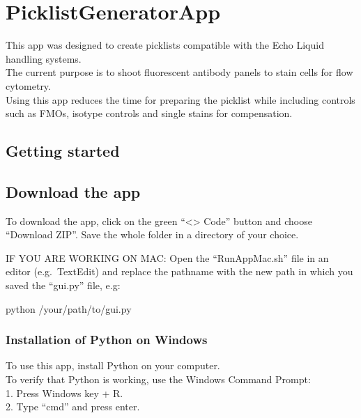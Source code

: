 \documentclass[
]{article}
\author{}
\date{\vspace{-2.5em}}
\newenvironment{Shaded}{\begin{snugshade}}{\end{snugshade}}
\newcommand{\NormalTok}[1]{#1}
\begin{document}
\hypertarget{picklistgeneratorapp}{%
\section{PicklistGeneratorApp}\label{picklistgeneratorapp}}

This app was designed to create picklists compatible with the Echo
Liquid handling systems.\\
The current purpose is to shoot fluorescent antibody panels to stain
cells for flow cytometry.\\
Using this app reduces the time for preparing the picklist while
including controls such as FMOs, isotype controls and single stains for
compensation.

\hypertarget{getting-started}{%
\subsection{Getting started}\label{getting-started}}

\hypertarget{download-the-app}{%
\subsection{Download the app}\label{download-the-app}}

To download the app, click on the green ``\textless\textgreater{} Code''
button and choose ``Download ZIP''. Save the whole folder in a directory
of your choice.

IF YOU ARE WORKING ON MAC: Open the ``RunAppMac.sh'' file in an editor
(e.g.~TextEdit) and replace the pathname with the new path in which you
saved the ``gui.py'' file, e.g:

\begin{Shaded}
\begin{Highlighting}[]
\NormalTok{python /your/path/to/gui.py}
\end{Highlighting}
\end{Shaded}

\hypertarget{installation-of-python-on-windows}{%
\subsubsection{Installation of Python on
Windows}\label{installation-of-python-on-windows}}

To use this app, install Python on your computer.\\
To verify that Python is working, use the Windows Command Prompt:\\
1. Press Windows key + R.\\
2. Type ``cmd'' and press enter.
\end{document}
